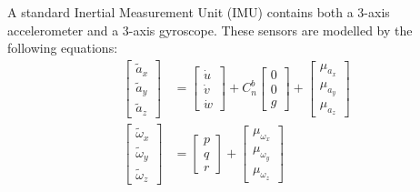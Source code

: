A standard Inertial Measurement Unit (IMU) contains both a 3-axis accelerometer and a 3-axis gyroscope. These sensors are modelled by the following equations:
\begin{equation}\label{eqn:IMU}
\begin{split}
\begin{bmatrix}
\tilde{a}_{x}\\
\tilde{a}_{y}\\
\tilde{a}_{z}
\end{bmatrix}
&=
\begin{bmatrix}
\dot{u}\\
\dot{v}\\
\dot{w}
\end{bmatrix}
+
C^{b}_{n}
\begin{bmatrix}
0\\
0\\
g
\end{bmatrix}
+
\begin{bmatrix}
\mu_{a_{x}}\\
\mu_{a_{y}}\\
\mu_{a_{z}}
\end{bmatrix}\\
\begin{bmatrix}
\tilde{\omega}_{x}\\
\tilde{\omega}_{y}\\
\tilde{\omega}_{z}
\end{bmatrix}
&=
\begin{bmatrix}
p\\
q\\
r
\end{bmatrix}
+
\begin{bmatrix}
\mu_{\omega_{x}}\\
\mu_{\omega_{y}}\\
\mu_{\omega_{z}}
\end{bmatrix}
\end{split}
\end{equation}

